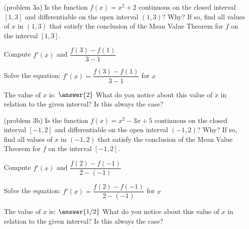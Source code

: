 \documentclass[handout]{ximera}
\begin{document}
\begin{example}[example 3]
\begin{image}
\end{image}


\end{example}

\begin{problem}(problem 3a)
  Is the function $f(x) = x^2 + 2$ continuous on the closed interval $[1,3]$ and differentiable on the open interval $(1,3)$? Why?
  If so, find all values of $x$ in $(1,3)$ that satisfy the conclusion of the Mean Value Theorem for $f$ on the interval $[1,3]$.
	
    \begin{hint}
      Compute $f'(x)$ and $\dfrac{f(3) - f(1)}{3-1}$
    \end{hint}
		\begin{hint}
		  Solve the equation: $f'(x) = \dfrac{f(3) - f(1)}{3-1}$ for $x$
		\end{hint}
		
		The value of $x$ is:
		 $\answer{2}$
     What do you notice about this value of $x$ in relation to the given interval? Is this always the case?
\end{problem}

\begin{problem}(problem 3b)
  Is the function $f(x) = x^2 -3x + 5$ continuous on the closed interval $[-1,2]$ and differentiable on the open interval $(-1,2)$? Why?
  If so, find all values of $x$ in $(-1,2)$ that satisfy the conclusion of the Mean Value Theorem for $f$ on the interval $[-1,2]$.
	
    \begin{hint}
      Compute $f'(x)$ and $\dfrac{f(2) - f(-1)}{2-(-1)}$
    \end{hint}
		\begin{hint}
		  Solve the equation: $f'(x) = \dfrac{f(2) - f(-1)}{2-(-1)}$ for $x$
		\end{hint}
		
		The value of $x$ is:
		 $\answer{1/2}$
 What do you notice about this value of $x$ in relation to the given interval? Is this always the case?
\end{problem}
\end{document}
